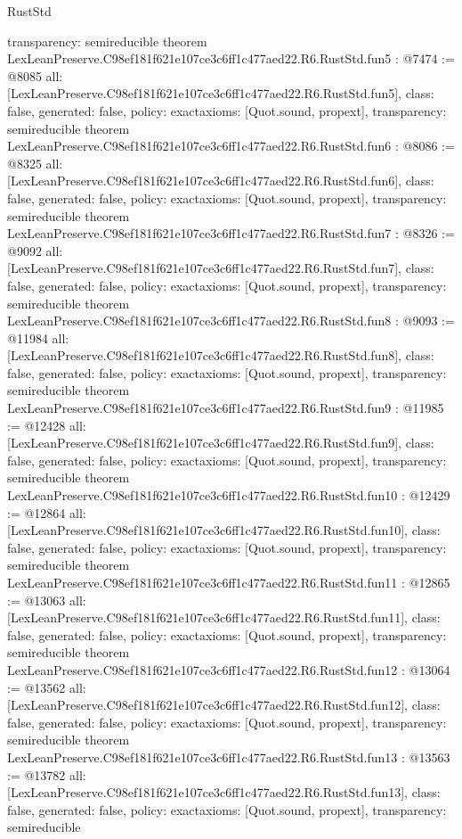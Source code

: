 \begin{lexlean}{RustStd}
\begin{coremodule}
{  transparency: semireducible
}
theorem LexLeanPreserve.C98ef181f621e107ce3c6ff1c477aed22.R6.RustStd.fun5 : @7474 := @8085 {
  all: [LexLeanPreserve.C98ef181f621e107ce3c6ff1c477aed22.R6.RustStd.fun5],
  class: false,
  generated: false,
  policy: exact{axioms: [Quot.sound, propext]},
  transparency: semireducible
}
theorem LexLeanPreserve.C98ef181f621e107ce3c6ff1c477aed22.R6.RustStd.fun6 : @8086 := @8325 {
  all: [LexLeanPreserve.C98ef181f621e107ce3c6ff1c477aed22.R6.RustStd.fun6],
  class: false,
  generated: false,
  policy: exact{axioms: [Quot.sound, propext]},
  transparency: semireducible
}
theorem LexLeanPreserve.C98ef181f621e107ce3c6ff1c477aed22.R6.RustStd.fun7 : @8326 := @9092 {
  all: [LexLeanPreserve.C98ef181f621e107ce3c6ff1c477aed22.R6.RustStd.fun7],
  class: false,
  generated: false,
  policy: exact{axioms: [Quot.sound, propext]},
  transparency: semireducible
}
theorem LexLeanPreserve.C98ef181f621e107ce3c6ff1c477aed22.R6.RustStd.fun8 : @9093 := @11984 {
  all: [LexLeanPreserve.C98ef181f621e107ce3c6ff1c477aed22.R6.RustStd.fun8],
  class: false,
  generated: false,
  policy: exact{axioms: [Quot.sound, propext]},
  transparency: semireducible
}
theorem LexLeanPreserve.C98ef181f621e107ce3c6ff1c477aed22.R6.RustStd.fun9 : @11985 := @12428 {
  all: [LexLeanPreserve.C98ef181f621e107ce3c6ff1c477aed22.R6.RustStd.fun9],
  class: false,
  generated: false,
  policy: exact{axioms: [Quot.sound, propext]},
  transparency: semireducible
}
theorem LexLeanPreserve.C98ef181f621e107ce3c6ff1c477aed22.R6.RustStd.fun10 : @12429 := @12864 {
  all: [LexLeanPreserve.C98ef181f621e107ce3c6ff1c477aed22.R6.RustStd.fun10],
  class: false,
  generated: false,
  policy: exact{axioms: [Quot.sound, propext]},
  transparency: semireducible
}
theorem LexLeanPreserve.C98ef181f621e107ce3c6ff1c477aed22.R6.RustStd.fun11 : @12865 := @13063 {
  all: [LexLeanPreserve.C98ef181f621e107ce3c6ff1c477aed22.R6.RustStd.fun11],
  class: false,
  generated: false,
  policy: exact{axioms: [Quot.sound, propext]},
  transparency: semireducible
}
theorem LexLeanPreserve.C98ef181f621e107ce3c6ff1c477aed22.R6.RustStd.fun12 : @13064 := @13562 {
  all: [LexLeanPreserve.C98ef181f621e107ce3c6ff1c477aed22.R6.RustStd.fun12],
  class: false,
  generated: false,
  policy: exact{axioms: [Quot.sound, propext]},
  transparency: semireducible
}
theorem LexLeanPreserve.C98ef181f621e107ce3c6ff1c477aed22.R6.RustStd.fun13 : @13563 := @13782 {
  all: [LexLeanPreserve.C98ef181f621e107ce3c6ff1c477aed22.R6.RustStd.fun13],
  class: false,
  generated: false,
  policy: exact{axioms: [Quot.sound, propext]},
  transparency: semireducible
}
\end{coremodule}
\end{lexlean}
